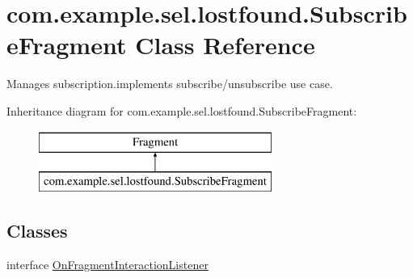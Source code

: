 \hypertarget{classcom_1_1example_1_1sel_1_1lostfound_1_1SubscribeFragment}{}\section{com.\+example.\+sel.\+lostfound.\+Subscribe\+Fragment Class Reference}
\label{classcom_1_1example_1_1sel_1_1lostfound_1_1SubscribeFragment}


Manages subscription.\+implements subscribe/unsubscribe use case.  


Inheritance diagram for com.\+example.\+sel.\+lostfound.\+Subscribe\+Fragment\+:\begin{figure}[H]
\begin{center}
\leavevmode
\includegraphics[height=2.000000cm]{classcom_1_1example_1_1sel_1_1lostfound_1_1SubscribeFragment}
\end{center}
\end{figure}
\subsection*{Classes}
\begin{DoxyCompactItemize}
\item 
interface \hyperlink{interfacecom_1_1example_1_1sel_1_1lostfound_1_1SubscribeFragment_1_1OnFragmentInteractionListener}{On\+Fragment\+Interaction\+Listener}
\end{DoxyCompactItemize}
